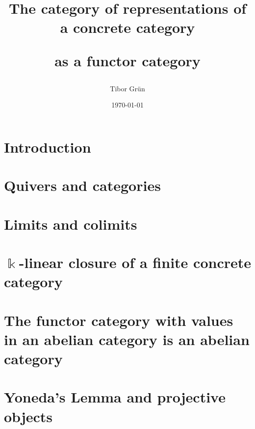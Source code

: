 \documentclass[a4paper,12pt,twoside]{article}
\title{The category of representations of a concrete category\par as a functor category}
\author{Tibor Gr{\"u}n}
\date{\today}
\begin{document}

	

	\newpage
	\phantom{}%
	\newpage

	\tableofcontents\label{toc}
	
	\newpage
	\phantom{}%
	\newpage

	
\section{Introduction}


\section{Quivers and categories}\label{sec:quivers_categories}


\section{Limits and colimits}\label{sec:limits_colimits}


\section{$\Bbbk$-linear closure of a finite concrete category}\label{sec:algebroids}


\section{The functor category with values in an abelian category is an abelian category}\label{sec:functor_cat_abelian}


\section{Yoneda's Lemma and projective objects}\label{sec:yoneda_projective}

\end{document}
